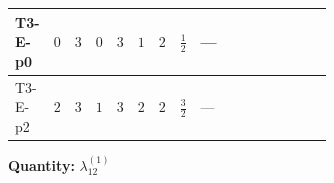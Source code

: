 \documentclass[8pt]{article}
\begin{document}
\begin{landscape}
\begin{longtable}{@{}llcccccc >{\raggedright\arraybackslash}p{0.21\linewidth} >{\raggedright\arraybackslash}p{0.21\linewidth} >{\raggedright\arraybackslash}p{0.21\linewidth}@{}}
\midrule
T3-E-p0 & $0$ & $3$ & $0$ & $3$ & $1$ & $2$ & $\frac{1}{2}$ & --- & \scriptsize\adjustbox{max width=\linewidth}{$\begin{gathered} {\lambda_{12}^{(1)}} \left(2 T_{\nu}^{(1)}+2 T_{\nu}^{(2)}+\frac{16 {\lambda_{12}^{(\times)}}}{3}+4 {\lambda_{S_1}^{(A)}}+4 {\lambda_{S_2}^{(A)}}\right)\end{gathered}$} & \scriptsize\adjustbox{max width=\linewidth}{$\begin{gathered} +{\lambda_{12}^{(\times)}} \left(\frac{4}{3} T_{\nu}^{(1)}+\frac{4}{3} T_{\nu}^{(2)}\right)\end{gathered}$} \\
\midrule
T3-E-p2 & $2$ & $3$ & $1$ & $3$ & $2$ & $2$ & $\frac{3}{2}$ & --- & \scriptsize\adjustbox{max width=\linewidth}{$\begin{gathered} {\lambda_{12}^{(1)}} \left(2 T_{\nu}^{(1)}+2 T_{\nu}^{(2)}+\frac{16 {\lambda_{12}^{(\times)}}}{3}+4 {\lambda_{S_1}^{(A)}}+4 {\lambda_{S_2}^{(A)}}\right)\end{gathered}$} & \scriptsize\adjustbox{max width=\linewidth}{$\begin{gathered} +{\lambda_{12}^{(\times)}} \left(\frac{4}{3} T_{\nu}^{(1)}+\frac{4}{3} T_{\nu}^{(2)}\right)\end{gathered}$} \\
\midrule
\bottomrule
\end{longtable}
\clearpage
\noindent\textbf{Quantity: }$\lambda_{12}^{(1)}$\par\smallskip

\end{landscape}
\end{document}
